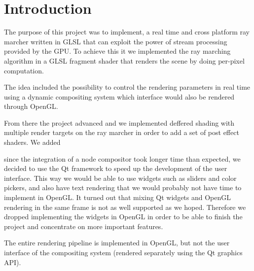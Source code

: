 \chapter{Introduction}
	
	The purpose of this project was to implement, a real time and cross platform
	ray marcher written in GLSL that can exploit the power of stream
	processing provided by the GPU. To achieve this it we implemented the ray marching
    algorithm in a GLSL fragment shader that renders the scene by doing per-pixel
	computation.
	
	The idea included the possibility to control the rendering parameters in real time
	using a dynamic compositing system which interface would also be rendered through OpenGL.
	
	From there the project advanced and we implemented deffered shading with multiple
    render targets on the ray marcher in order to add a set of post effect shaders. 
    We added 
	
    since the integration of a node compositor took longer time than expected,
    we decided to use the Qt framework to speed up the development of the user interface.
    This way we would be able to use widgets such as sliders and color pickers,
    and also have text rendering that we would probably not have time to implement
    in OpenGL. It turned out that mixing
    Qt widgets and OpenGL rendering in the same frame is not as well supported as
    we hoped. Therefore we dropped implementing the widgets in OpenGL in order to
    be able to finish the project and concentrate on more important features.

    The entire rendering pipeline is implemented in OpenGL, but not the user interface
    of the compositing system (rendered separately using the Qt graphics API).

